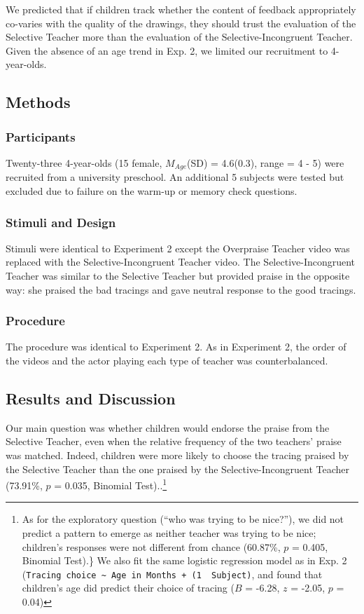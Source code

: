\documentclass[10pt, letterpaper]{article}
\begin{document}
We predicted that if children track whether the content of feedback
appropriately co-varies with the quality of the drawings, they should
trust the evaluation of the Selective Teacher more than the evaluation
of the Selective-Incongruent Teacher. Given the absence of an age trend
in Exp. 2, we limited our recruitment to 4-year-olds.

\subsection{Methods}\label{methods-2}

\subsubsection{Participants}\label{participants-2}

Twenty-three 4-year-olds (15 female, \(M_{Age}\)(SD) = 4.6(0.3), range =
4 - 5) were recruited from a university preschool. An additional 5
subjects were tested but excluded due to failure on the warm-up or
memory check questions.

\subsubsection{Stimuli and Design}\label{stimuli-and-design}

Stimuli were identical to Experiment 2 except the Overpraise Teacher
video was replaced with the Selective-Incongruent Teacher video. The
Selective-Incongruent Teacher was similar to the Selective Teacher but
provided praise in the opposite way: she praised the bad tracings and
gave neutral response to the good tracings.

\subsubsection{Procedure}\label{procedure-2}

The procedure was identical to Experiment 2. As in Experiment 2, the
order of the videos and the actor playing each type of teacher was
counterbalanced.

\subsection{Results and Discussion}\label{results-and-discussion-2}

Our main question was whether children would endorse the praise from the
Selective Teacher, even when the relative frequency of the two teachers'
praise was matched. Indeed, children were more likely to choose the
tracing praised by the Selective Teacher than the one praised by the
Selective-Incongruent Teacher (73.91\%, \(p\) = 0.035, Binomial
Test)..\footnote{As for the exploratory question (``who was trying to be
  nice?''), we did not predict a pattern to emerge as neither teacher
  was trying to be nice; children's responses were not different from
  chance (60.87\%, \(p\) = 0.405, Binomial Test).\} We also fit the same
  logistic regression model as in Exp. 2
  (\texttt{Tracing\ choice\ \textasciitilde{}\ Age\ in\ Months\ +\ (1\ \textbar{}\ Subject)},
  and found that children's age did predict their choice of tracing
  (\(B\) = -6.28, \(z\) = -2.05, \(p\) = 0.04)}
\end{document}
